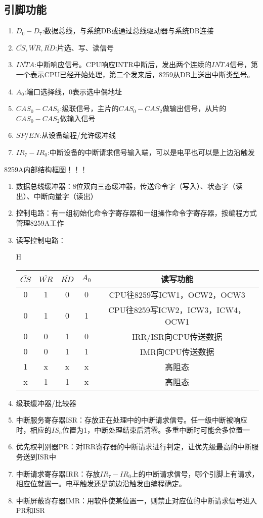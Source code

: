 \subsection{引脚功能}
\begin{enumerate}
    \item $D_0-D_7$:数据总线，与系统DB或通过总线驱动器与系统DB连接
    \item $\overline{CS},\overline{WR},\overline{RD}$:片选、写、读信号
    \item $\overline{INTA}$:中断响应信号。CPU响应INTR中断后，发出两个连续的$\overline{INTA}$信号，第一个表示CPU已经开始处理，第二个发来后，8259从DB上送出中断类型号。
    \item $A_0$:端口选择线，0表示选中偶地址
    \item $CAS_0-CAS_2$:级联信号，主片的$CAS_0-CAS_2$做输出信号，从片的$CAS_0-CAS_2$做输入信号
    \item $\overline{SP}/\overline{EN}$:从设备编程/允许缓冲线
    \item $IR_7-IR_0$:中断设备的中断请求信号输入端，可以是电平也可以是上边沿触发
\end{enumerate}
8259A内部结构框图！！！
\begin{enumerate}
    \item 数据总线缓冲器：8位双向三态缓冲器，传送命令字（写入）、状态字（读出）、中断向量字（读出）
    \item 控制电路：有一组初始化命令字寄存器和一组操作命令字寄存器，按编程方式管理8259A工作
    \item 读写控制电路：
    \begin{table}{H}
        \begin{tabular}{|c|c|c|c|c|}
            $\overline{CS}$&$\overline{WR}$&$\overline{RD}$&$A_0$&读写功能\\\hline
            0&1&0&0&CPU往8259写ICW1，OCW2，OCW3\\ \hline
            0&1&0&1&CPU往8259写ICW2，ICW3，ICW4，OCW1\\\hline
            0&0&1&0&IRR/ISR向CPU传送数据\\\hline
            0&0&1&1&IMR向CPU传送数据\\\hline
            1&x&x&x&高阻态\\\hline
            x&1&1&x&高阻态\\\hline
        \end{tabular}
    \end{table}
    \item 级联缓冲器/比较器
    \item 中断服务寄存器ISR：存放正在处理中的中断请求信号。任一级中断被响应时，相应的$IS_n$位置为1，中断处理结束后清零。多重中断时可能会多位置一
    \item 优先权判别器PR：对IRR寄存器的中断请求进行判定，让优先级最高的中断服务送到ISR中
    \item 中断请求寄存器IRR：存放$IR_7-IR_0$上的中断请求信号，哪个引脚上有请求，相应位就置一。电平触发还是前边沿触发由编程确定。
    \item 中断屏蔽寄存器IMR：用软件使某位置一，则禁止对应位的中断请求信号进入PR和ISR
\end{enumerate}
